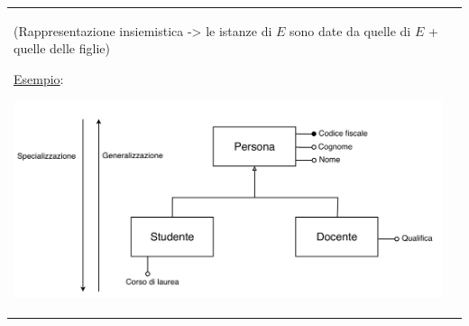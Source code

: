 \documentclass[a4paper, 10pt]{report}
\begin{document}
\begin{longtable}{| p{} | p{} |}
\begin{center}
(Rappresentazione insiemistica -> le istanze di $E$ sono date da quelle di $E$ + quelle delle figlie)
\end{center}


\underline{Esempio}:

\begin{center}
\includegraphics[scale=0.4]{3.pdf}
\end{center}

\end{longtable}
\end{document}
